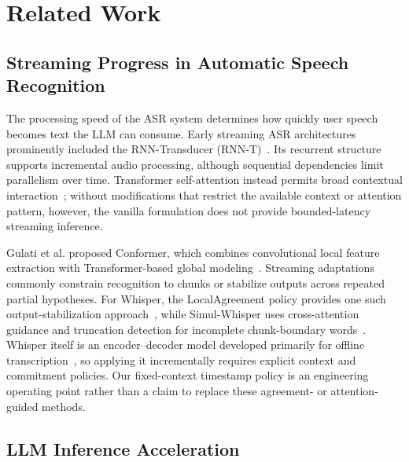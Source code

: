 \documentclass[conference]{IEEEtran}
\begin{document}
\section{Related Work}\label{sec:related}

\subsection{Streaming Progress in Automatic Speech Recognition}

The processing speed of the ASR system determines how quickly user speech becomes text the LLM can consume. Early streaming ASR architectures prominently included the RNN-Transducer (RNN-T)~\cite{ref3}. Its recurrent structure supports incremental audio processing, although sequential dependencies limit parallelism over time. Transformer self-attention instead permits broad contextual interaction~\cite{ref4}; without modifications that restrict the available context or attention pattern, however, the vanilla formulation does not provide bounded-latency streaming inference.

Gulati et al. proposed Conformer, which combines convolutional local feature extraction with Transformer-based global modeling~\cite{gulati2020conformer}. Streaming adaptations commonly constrain recognition to chunks or stabilize outputs across repeated partial hypotheses. For Whisper, the LocalAgreement policy provides one such output-stabilization approach~\cite{liu2020partialhypothesis,machacek2023turning}, while Simul-Whisper uses cross-attention guidance and truncation detection for incomplete chunk-boundary words~\cite{wang2024simulwhisper}. Whisper itself is an encoder--decoder model developed primarily for offline transcription~\cite{ref6}, so applying it incrementally requires explicit context and commitment policies. Our fixed-context timestamp policy is an engineering operating point rather than a claim to replace these agreement- or attention-guided methods.

\subsection{LLM Inference Acceleration}
\end{document}
